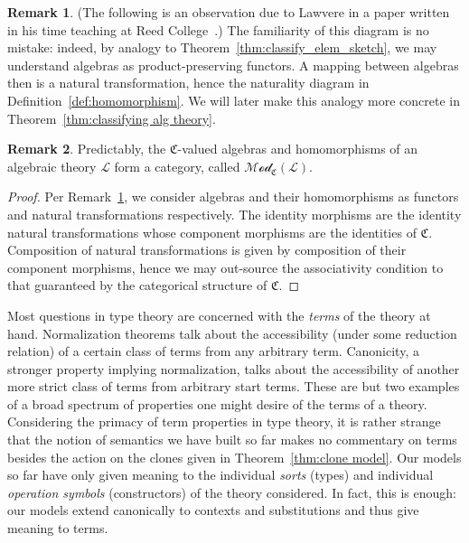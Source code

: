 \documentclass[12pt,twoside]{reedthesis}
\theoremstyle{definition}
\newtheorem{remark}{Remark}
\theoremstyle{remark}
\theoremstyle{plain}
\begin{document}
\begin{remark}\label{rmk:alg_func}
  (The following is an observation due to Lawvere in a paper written in his time
  teaching at Reed College~\cite{lawvere_functorial_1963}.) The familiarity of
  this diagram is no mistake: indeed, by analogy to
  Theorem~\ref{thm:classify_elem_sketch}, we may understand algebras as
  product-preserving functors. A mapping between algebras then is a natural
  transformation, hence the naturality diagram in
  Definition~\ref{def:homomorphism}. We will later make this analogy more
  concrete in Theorem~\ref{thm:classifying alg theory}.
\end{remark}

\begin{remark}
  Predictably, the $\mathfrak{C}$-valued algebras and homomorphisms of an
  algebraic theory $\mathcal{L}$ form a category, called
  $\mathscr{Mod}_{\mathfrak{C}}(\mathcal{L})$.
  \begin{proof}
    Per Remark~\ref{rmk:alg_func}, we consider algebras and their homomorphisms
    as functors and natural transformations respectively. The identity morphisms
    are the identity natural transformations whose component morphisms are the
    identities of $\mathfrak{C}$. Composition of natural transformations is
    given by composition of their component morphisms, hence we may out-source
    the associativity condition to that guaranteed by the categorical structure
    of $\mathfrak{C}$.
  \end{proof}

\end{remark}

Most questions in type theory are concerned with the \emph{terms} of the theory
at hand. Normalization theorems talk about the accessibility (under some
reduction relation) of a certain class of terms from any arbitrary term.
Canonicity, a stronger property implying normalization, talks about the
accessibility of another more strict class of terms from arbitrary start terms.
These are but two examples of a broad spectrum of properties one might desire of
the terms of a theory. Considering the primacy of term properties in type
theory, it is rather strange that the notion of semantics we have built so far
makes no commentary on terms besides the action on the clones given in
Theorem~\ref{thm:clone model}. Our models so far have only given meaning to the
individual \emph{sorts} (types) and individual \emph{operation symbols}
(constructors) of the theory considered. In fact, this is enough: our models
extend canonically to contexts and substitutions and thus give meaning to terms.
\end{document}
